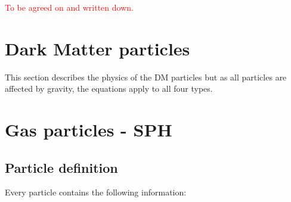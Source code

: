 \documentclass[a4paper,10pt]{report}
\begin{document}
\textcolor{red}{To be agreed on and written down.}












\chapter{Dark Matter particles}
\label{chap:DMs}

This section describes the physics of the DM particles but as all particles are affected by gravity, the equations
apply to all four types. 
























\chapter{Gas particles - SPH}
\label{chap:SPH}

\section{Particle definition}
Every particle contains the following information:
\end{document}
